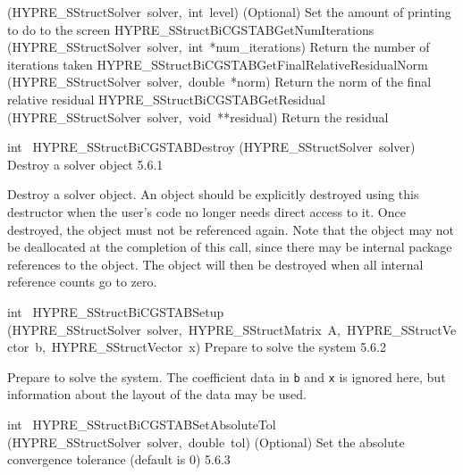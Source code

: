 \documentclass{article}
\begin{document}
\begin{cxxentry}
\begin{cxxentry}
\begin{cxxnames}
        {(HYPRE\_SStructSolver\ solver,\ int\ level)}
        {
(Optional) Set the amount of printing to do to the screen}
        {}
\label{cxx.5.6.10}
        {HYPRE\_SStructBiCGSTABGetNumIterations}
        {(HYPRE\_SStructSolver\ solver,\ int\ *num\_iterations)}
        {
Return the number of iterations taken}
        {}
\label{cxx.5.6.11}
        {HYPRE\_SStructBiCGSTABGetFinalRelativeResidualNorm}
        {(HYPRE\_SStructSolver\ solver,\ double\ *norm)}
        {
Return the norm of the final relative residual}
        {}
\label{cxx.5.6.12}
        {HYPRE\_SStructBiCGSTABGetResidual}
        {(HYPRE\_SStructSolver\ solver,\ void\ **residual)}
        {
Return the residual}
        {}
\label{cxx.5.6.13}
\end{cxxnames}
\begin{cxxfunction}
{int\ }
        {HYPRE\_SStructBiCGSTABDestroy}
        {(HYPRE\_SStructSolver\ solver)}
        {
Destroy a solver object}
        {5.6.1}
\begin{cxxdoc}

Destroy a solver object.  An object should be explicitly destroyed
using this destructor when the user's code no longer needs direct
access to it.  Once destroyed, the object must not be referenced
again.  Note that the object may not be deallocated at the
completion of this call, since there may be internal package
references to the object.  The object will then be destroyed when
all internal reference counts go to zero.
\end{cxxdoc}
\end{cxxfunction}
\begin{cxxfunction}
{int\ }
        {HYPRE\_SStructBiCGSTABSetup}
        {(HYPRE\_SStructSolver\ solver,\ HYPRE\_SStructMatrix\ A,\ HYPRE\_SStructVector\ b,\ HYPRE\_SStructVector\ x)}
        {
Prepare to solve the system}
        {5.6.2}
\begin{cxxdoc}

Prepare to solve the system.  The coefficient data in {\tt b} and {\tt x} is
ignored here, but information about the layout of the data may be used.
\end{cxxdoc}
\end{cxxfunction}
\begin{cxxfunction}
{int\ }
        {HYPRE\_SStructBiCGSTABSetAbsoluteTol}
        {(HYPRE\_SStructSolver\ solver,\ double\ tol)}
        {
(Optional) Set the absolute convergence tolerance (default is 0)}
        {5.6.3}
\begin{cxxdoc}


\end{cxxdoc}
\end{cxxfunction}
\end{cxxentry}
\end{cxxentry}
\end{document}
